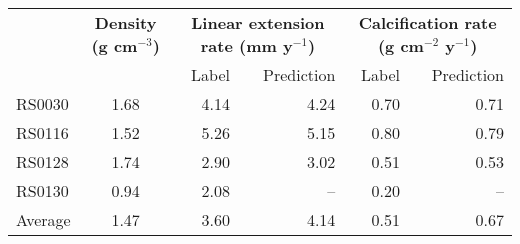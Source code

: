 \begin{tabular}{@{}lrrrrrr@{}}
\toprule
         & \multicolumn{2}{c}{\textbf{Density (g cm$^{-3}$)}} & \multicolumn{2}{c}{\textbf{Linear extension rate (mm y$^{-1}$)}} & \multicolumn{2}{c}{\textbf{Calcification rate (g cm$^{-2}$ y$^{-1}$)}} \\ 
         &                             &                      &  \quad\quad\quad    Label &       Prediction\quad\quad\quad\quad &        \quad\quad\quad    Label &       Prediction\quad\quad\quad\quad \\ \midrule 
RS0030   &          \multicolumn{2}{c}{1.68}                  &                     4.14  &             4.24\quad\quad\quad\quad &                            0.70 &             0.71\quad\quad\quad\quad \\
RS0116   &          \multicolumn{2}{c}{1.52}                  &                     5.26  &             5.15\quad\quad\quad\quad &                            0.80 &             0.79\quad\quad\quad\quad \\
RS0128   &          \multicolumn{2}{c}{1.74}                  &                     2.90  &             3.02\quad\quad\quad\quad &                            0.51 &             0.53\quad\quad\quad\quad \\
RS0130   &          \multicolumn{2}{c}{0.94}                  &                     2.08  &               --\quad\quad\quad\quad &                            0.20 &               --\quad\quad\quad\quad \\ \midrule
Average  &          \multicolumn{2}{c}{1.47}                  &                     3.60  &             4.14\quad\quad\quad\quad &                            0.51 &             0.67\quad\quad\quad\quad \\ \bottomrule
\end{tabular}